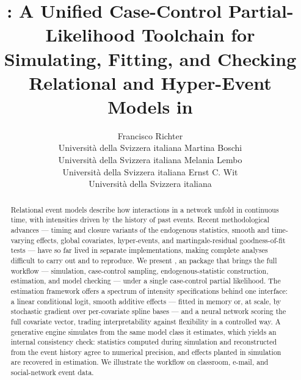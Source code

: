\title{: A Unified Case-Control Partial-Likelihood Toolchain for
Simulating, Fitting, and Checking Relational and Hyper-Event Models in }

\author{
  Francisco Richter \\ Universit\`a della Svizzera italiana
  \And
  Martina Boschi \\ Universit\`a della Svizzera italiana
  \AND
  Melania Lembo \\ Universit\`a della Svizzera italiana
  \And
  Ernst C. Wit \\ Universit\`a della Svizzera italiana
}


\date{}

\begin{abstract}
Relational event models describe how interactions in a network unfold in
continuous time, with intensities driven by the history of past events.
Recent methodological advances --- timing and closure variants of the
endogenous statistics, smooth and time-varying effects, global covariates,
hyper-events, and martingale-residual goodness-of-fit tests --- have so far
lived in separate implementations, making complete analyses difficult to
carry out and to reproduce. We present , an  package
that brings the full workflow --- simulation, case-control sampling,
endogenous-statistic construction, estimation, and model checking --- under
a single case-control partial likelihood. The estimation framework offers a
spectrum of intensity specifications behind one interface: a linear
conditional logit, smooth additive effects --- fitted in memory or, at scale,
by stochastic gradient over per-covariate spline bases --- and a neural
network scoring the full covariate vector, trading interpretability against
flexibility in a controlled way. A generative engine simulates from the
same model class it estimates, which yields an internal consistency check:
statistics computed during simulation and reconstructed from the event
history agree to numerical precision, and effects planted in simulation are
recovered in estimation. We illustrate the workflow on classroom,
e-mail, and social-network event data.
\end{abstract}

